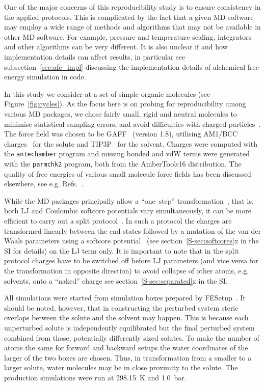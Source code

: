 \documentclass[journal=jctcce,manuscript=article]{achemso}
\newcommand{\progname}[1]{\texttt{#1}}
\begin{document}
One of the major concerns of this reproducibility study is to ensure
consistency in the applied protocols.  This is complicated by the fact
that a given MD software may employ a wide range of methods and algorithms that
may not be available in other MD software.  For example, pressure and
temperature scaling, integrators and other algorithms can be very
different.  It is also unclear if and how implementation details can
affect results, in particular see subsection~\ref{sec:afe_impl} discussing the 
implementation details of alchemical free energy simulation in code.

In this study we consider at a set of simple organic molecules (see
Figure~\ref{fig:cycles}).  As the focus here is on probing for
reproducibility among various MD packages, we chose fairly small,
rigid and neutral molecules to minimise statistical sampling errors, and
avoid difficulties with charged
particles~\cite{rocklin_calculating_2013, JCC:JCC1050}.  The force
field was chosen to be GAFF~\cite{wang_development_2004} (version
1.8), utilising AM1/BCC charges~\cite{jakalian_fast_2000,
  jakalian_fast_2002} for the solute and
TIP3P~\cite{jorgensen_comparison_1983-1} for the solvent.  Charges were 
computed with the \progname{antechamber} program and missing bonded and vdW 
terms were generated with the \progname{parmchk2} program, both from the 
AmberTools16 distribution.  The quality of free energies of various small 
molecule force fields has been discussed
elsewhere, see e.g. Refs.~.

While the MD packages principally allow a ``one--step'' 
transformation~\cite{steinbrecher_soft-core_2011},
that is, both LJ and Coulombic softcore potentials vary
simultaneously, it can be more efficient to carry out a
split protocol~\cite{naden_linear_2014, naden_linear_2015}. 
In such a protocol the charges are transformed
linearly between the end states followed by a mutation of the van der
Waals parameters using a softcore
potential~\cite{beutler_avoiding_1994,
  zacharias_separationshifted_1994} (see section~\ref{S-sec:softcores}x in the 
  SI for details) on the LJ
term only.  It is important to note that in the split protocol
charges have to be switched off before LJ parameters (and vice versa
for the transformation in opposite direction) to avoid collapse of
other atoms, e.g. solvents, onto a ``naked'' 
charge\cite{pitera_comparison_2002, anwar_robust_2005, 
steinbrecher_soft-core_2011} see section~\ref{S-sec:separated}x in the SI.

All simulations were started from simulation boxes prepared by 
FESetup~\cite{loeffler_fesetup:_2015}.  It should be noted, however, that in 
constructing the perturbed system steric overlaps between the solute and the 
solvent may happen.  This is because each unperturbed solute is independently 
equilibrated but the final perturbed system combined from those, potentially 
differently sized solutes.  To make the number of atoms the same for forward 
and backward setups the water coordinates of the larger of the two boxes are 
chosen.  Thus, in transformation from a smaller to a larger solute, water 
molecules may be in close proximity to the solute.  The production simulations 
were run at \SI{298.15}{K} and \SI{1.0}{bar}.
\end{document}
